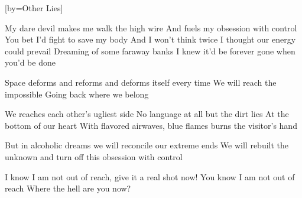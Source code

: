 [by={Other Lies}]

  \chordsoff
  \beginverse
  My dare devil makes me walk the high wire
  And fuels my obsession with control
  You bet I'd fight to save my body
  And I won’t think twice
  I thought our energy could prevail
  Dreaming of some faraway banks
  I knew it’d be forever gone when you’d be done
  \endverse
  
  \beginchorus
  Space deforms and reforms and deforms itself every time
  We will reach the impossible
  Going back where we belong
  \endchorus
  
  \beginverse
  We reaches each other’s ugliest side
  No language at all but the dirt lies 
  At the bottom of our heart
  With flavored airwaves, blue flames burns the visitor's hand
  \endverse

  \beginchorus
  But in alcoholic dreams we will reconcile our extreme ends
  We will rebuilt the unknown and turn off this obsession with control
  \endchorus

  \beginverse
  I know I am not out of reach, give it a real shot now!
  You know I am not out of reach
  Where the hell are you now?
  \endverse
\endsong
